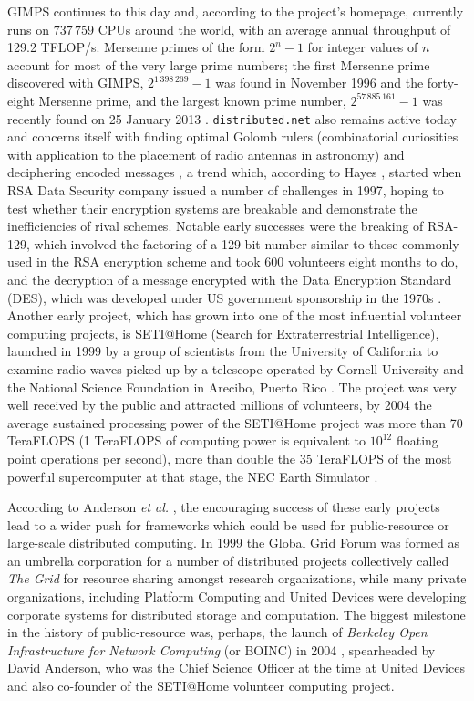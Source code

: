 GIMPS continues to this day and, according to the project's homepage, currently runs on $737\,759$ CPUs around the world, with an average annual throughput of 129.2 TFLOP/s. Mersenne primes of the form $2^n-1$ for integer  values of $n$ account for most of the very large prime numbers; the first Mersenne prime discovered with GIMPS, $2^{1\,398\,269}-1$ was found in November 1996 \cite{hayes} and the  forty-eight Mersenne prime, and the largest known prime number, $2^{57\,885\,161} -1$ was recently found on 25 January 2013 \cite{gimps}. \texttt{distributed.net} also remains active today and concerns itself with finding optimal Golomb rulers (combinatorial curiosities with application to the placement of radio antennas in astronomy) and deciphering encoded messages \cite{distnet}, a trend which, according to Hayes \cite{hayes}, started when RSA Data Security company issued a number of challenges in 1997, hoping to test whether their encryption systems are breakable and demonstrate the inefficiencies of rival schemes. Notable early successes were the breaking of RSA-129, which involved the factoring of a 129-bit number similar to those commonly used in the RSA encryption scheme and  took 600 volunteers eight months to do, and the decryption of a message encrypted with the Data Encryption Standard (DES), which was developed under US government sponsorship in the 1970s \cite{distnet}. 
Another early project, which has grown into one of the most influential volunteer computing projects, is   SETI@Home (Search for Extraterrestrial Intelligence), launched  in 1999 by a group of scientists from the University of California to examine radio waves picked up by a telescope operated by Cornell University and the National Science Foundation in Arecibo, Puerto Rico \cite{anderson:seti2002}. The project was very well received by the public and attracted millions of volunteers, by 2004 the average sustained processing power of the SETI@Home project was more than 70 TeraFLOPS (1 TeraFLOPS of computing power is equivalent to $10^{12}$ floating point operations per second), more than double the 35 TeraFLOPS of the most powerful supercomputer at that stage, the NEC Earth Simulator \cite{anderson2004boinc}.
 


According to Anderson \emph{et al.} \cite{anderson:seti2002}, the encouraging success of these early projects lead to a wider push for frameworks which could be used for public-resource or large-scale distributed computing. In 1999 the Global Grid Forum was formed as an umbrella corporation for a number of distributed projects collectively called \emph{The Grid} \cite{fostergrid} for resource sharing amongst research organizations, while many private organizations, including Platform Computing and United Devices were developing corporate systems for distributed storage and computation. The biggest milestone in the history of public-resource was, perhaps, the launch of \emph{Berkeley Open Infrastructure for Network Computing} (or BOINC) in 2004 \cite{anderson2004boinc}, spearheaded by David Anderson, who was the Chief Science Officer at the time at United Devices and also co-founder of the SETI@Home volunteer computing project. 

